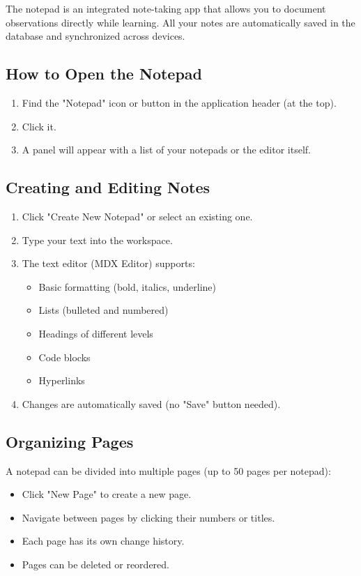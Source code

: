 The notepad is an integrated note-taking app that allows you to document observations directly while learning. All your notes are automatically saved in the database and synchronized across devices.

\subsection{How to Open the Notepad}

\begin{enumerate}
  \item Find the "Notepad" icon or button in the application header (at the top).
  \item Click it.
  \item A panel will appear with a list of your notepads or the editor itself.
\end{enumerate}

\subsection{Creating and Editing Notes}

\begin{enumerate}
  \item Click "Create New Notepad" or select an existing one.
  \item Type your text into the workspace.
  \item The text editor (MDX Editor) supports:
    \begin{itemize}
      \item Basic formatting (bold, italics, underline)
      \item Lists (bulleted and numbered)
      \item Headings of different levels
      \item Code blocks
      \item Hyperlinks
    \end{itemize}
  \item Changes are automatically saved (no "Save" button needed).
\end{enumerate}

\subsection{Organizing Pages}

A notepad can be divided into multiple pages (up to 50 pages per notepad):
\begin{itemize}
  \item Click "New Page" to create a new page.
  \item Navigate between pages by clicking their numbers or titles.
  \item Each page has its own change history.
  \item Pages can be deleted or reordered.
\end{itemize}

